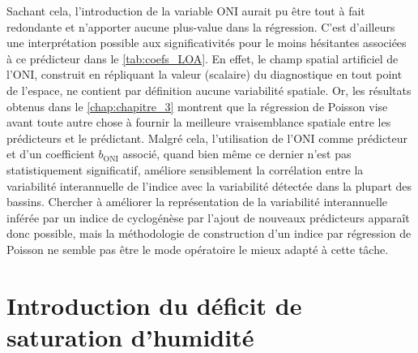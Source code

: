 \documentclass[../main.tex]{subfiles}
\begin{document}
Sachant cela, l'introduction de la variable ONI aurait pu être tout à fait redondante et n'apporter aucune plus-value dans la régression. C'est d'ailleurs une
interprétation possible aux significativités pour le moins hésitantes associées à ce prédicteur dans le \cref{tab:coefs_LOA}. En effet, le champ spatial
artificiel de l'ONI, construit en répliquant la valeur (scalaire) du diagnostique en tout point de l'espace, ne contient par définition aucune variabilité
spatiale. Or, les résultats obtenus dans le \cref{chap:chapitre_3} montrent que la régression de Poisson vise avant toute autre chose à fournir la meilleure
vraisemblance spatiale entre les prédicteurs et le prédictant. Malgré cela, l'utilisation de l'ONI comme prédicteur et d'un coefficient $b_{\mathrm{ONI}}$
associé, quand bien même ce dernier n'est pas statistiquement significatif, améliore sensiblement la corrélation entre la variabilité interannuelle de l'indice
avec la variabilité détectée dans la plupart des bassins. Chercher à améliorer la représentation de la variabilité interannuelle inférée par un indice de
cyclogénèse par l'ajout de nouveaux prédicteurs apparaît donc possible, mais la méthodologie de construction d'un indice par régression de Poisson ne semble pas
être le mode opératoire le mieux adapté à cette tâche.


\section{Introduction du déficit de saturation d'humidité}\label{sec:tendances_VPD}
\end{document}
